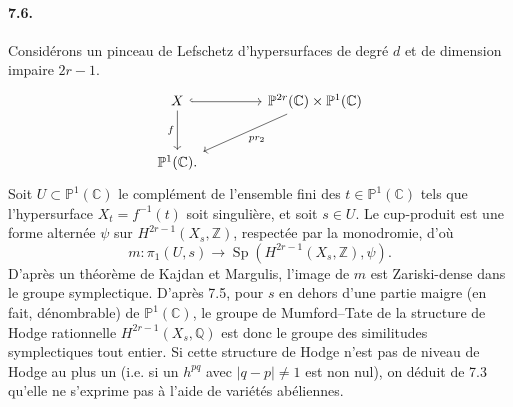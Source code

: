\documentclass[10pt,leqno]{article}
\newcommand{\C}{\mathbb{C}}
\newcommand{\Q}{\mathbb{Q}}
\newcommand{\Z}{\mathbb{Z}}
\begin{document}
\paragraph{7.6.} Considérons un pinceau de Lefschetz d'hypersurfaces de degré $d$ et de dimension impaire $2r-1$.
\[
\begin{tikzcd}[column sep=4.2em,row sep=2.6em]
X \arrow[r,hook] \arrow[d,"f"'] & \mathbb P^{2r}(\C)\times\mathbb P^1(\C) \arrow[dl,"pr_2"]\\
\mathbb P^1(\C). &
\end{tikzcd}
\]
Soit $U\subset\mathbb P^1(\C)$ le complément de l'ensemble fini des $t\in\mathbb P^1(\C)$ tels que l'hypersurface $X_t=f^{-1}(t)$ soit singulière, et soit $s\in U$. Le cup-produit est une forme alternée $\psi$ sur $H^{2r-1}(X_s,\Z)$, respectée par la monodromie, d'où
\[
m:\pi_1(U,s)\longrightarrow \operatorname{Sp}(H^{2r-1}(X_s,\Z),\psi).
\]
D'après un théorème de Kajdan et Margulis, l'image de $m$ est Zariski-dense dans le groupe symplectique. D'après 7.5, pour $s$ en dehors d'une partie maigre (en fait, dénombrable) de $\mathbb P^1(\C)$, le groupe de Mumford--Tate de la structure de Hodge rationnelle $H^{2r-1}(X_s,\Q)$ est donc le groupe des similitudes symplectiques tout entier. Si cette structure de Hodge n'est pas de niveau de Hodge au plus un (i.e. si un $h^{pq}$ avec $|q-p|\ne1$ est non nul), on déduit de 7.3 qu'elle ne s'exprime pas à l'aide de variétés abéliennes.

\clearpage
\end{document}
